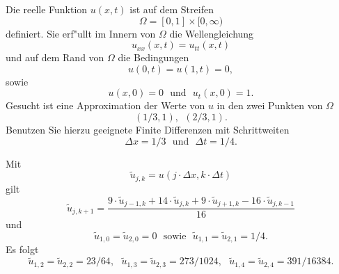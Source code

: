 Die reelle Funktion $u(x,t)$ ist auf dem Streifen
\[
\Omega = [0, 1] \times [0,\infty)
\]
definiert. Sie erf"ullt im Innern von $\Omega$ die Wellengleichung
\[
u_{xx}(x,t) = u_{tt}(x,t)
\]
und auf dem Rand von $\Omega$ die Bedingungen
\[
u(0,t) = u(1,t) = 0,
\]
sowie
\[
u(x,0) = 0 \ \ \ \text{und} \ \ \ u_t(x,0) = 1.
\]
Gesucht ist eine Approximation der Werte von $u$ in den zwei Punkten von $\Omega$
\[
(1/3, 1), \ \  (2/3, 1).
\]
Benutzen Sie hierzu geeignete Finite Differenzen mit Schrittweiten
\[
\Delta x = 1/3 \ \ \  \text{und} \ \  \ \Delta t = 1/4.
\]

\begin{loesung}
Mit
\[
\tilde u_{j,k} = u(j \cdot \Delta x, k \cdot \Delta t)
\]
gilt
\[
\tilde u_{j, k+1} = \frac{9 \cdot \tilde u_{j-1, k} + 14 \cdot \tilde u_{j, k} + 9 \cdot \tilde u_{j+1, k} - 16 \cdot \tilde u_{j, k-1}}{16}
\]
und
\[
\tilde u_{1,0} = \tilde u_{2,0} = 0 \ \ \ \text{sowie} \ \ \ \tilde u_{1,1} = \tilde u_{2,1} = 1/4.
\]
Es folgt
\[
\tilde u_{1,2} = \tilde u_{2,2} = 23/64, \ \ \ \tilde u_{1,3} = \tilde u_{2,3} = 273/1024, \ \ \ \tilde u_{1,4} = \tilde u_{2,4} = 391/16384.
\]   
\end{loesung}
